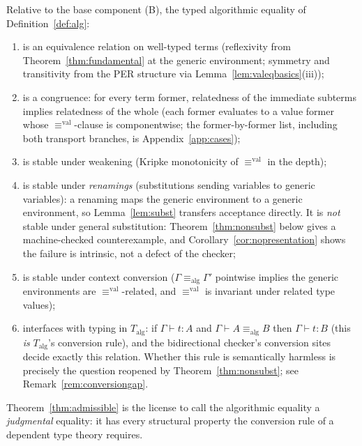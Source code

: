 \documentclass{lmcs}
\newcommand{\aconv}{\equiv_{\mathrm{alg}}}
\newcommand{\valeq}{\equiv^{\mathrm{val}}}
\begin{document}
\begin{thm}
  \label{thm:admissible}
  Relative to the base component (B), the typed algorithmic equality
  of Definition~\ref{def:alg}:
  \begin{enumerate}
  \item is an equivalence relation on well-typed terms
    (reflexivity from Theorem~\ref{thm:fundamental} at the generic
    environment; symmetry and transitivity from the PER structure via
    Lemma~\ref{lem:valeqbasics}(iii));
  \item is a congruence: for every term former, relatedness of the
    immediate subterms implies relatedness of the whole (each former
    evaluates to a value former whose $\valeq$-clause is
    componentwise; the former-by-former list, including both
    transport branches, is Appendix~\ref{app:cases});
  \item is stable under weakening (Kripke monotonicity of $\valeq$
    in the depth);
  \item is stable under \emph{renamings} (substitutions sending
    variables to generic variables): a renaming maps the generic
    environment to a generic environment, so Lemma~\ref{lem:subst}
    transfers acceptance directly.  It is \emph{not} stable under
    general substitution: Theorem~\ref{thm:nonsubst} below gives a
    machine-checked counterexample, and
    Corollary~\ref{cor:nopresentation} shows the failure is
    intrinsic, not a defect of the checker;
  \item is stable under context conversion ($\Gamma \aconv \Gamma'$
    pointwise implies the generic environments are $\valeq$-related,
    and $\valeq$ is invariant under related type values);
  \item interfaces with typing in $T_{\mathrm{alg}}$: if
    $\Gamma \vdash t : A$ and $\Gamma \vdash A \aconv B$ then
    $\Gamma \vdash t : B$ (this \emph{is} $T_{\mathrm{alg}}$'s
    conversion rule), and the bidirectional checker's conversion
    sites decide exactly this relation.  Whether this rule is
    semantically harmless is precisely the question reopened by
    Theorem~\ref{thm:nonsubst}; see
    Remark~\ref{rem:conversiongap}.
  \end{enumerate}
\end{thm}

\noindent Theorem~\ref{thm:admissible} is the license to call the
algorithmic equality a \emph{judgmental} equality: it has every
structural property the conversion rule of a dependent type theory
requires.
\end{document}
